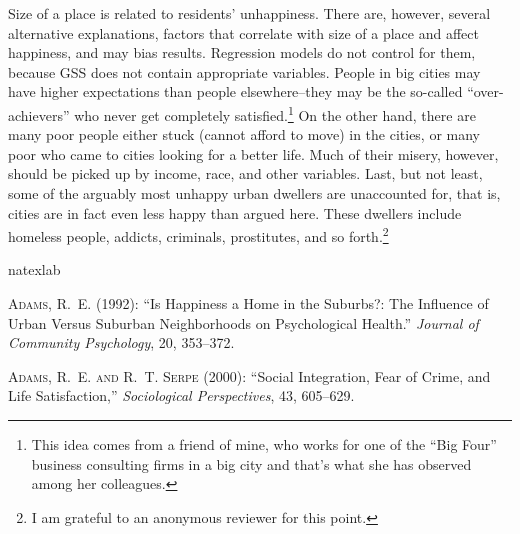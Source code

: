 \documentclass[12pt, letterpaper]{article}
\begin{document}
\begin{spacing}{1.9}
  
Size of a place is related to residents' unhappiness. 
 There are, however, several alternative
explanations, factors that correlate with size of a place and affect
happiness, and may bias results. Regression models do not control for them, because
GSS does not contain appropriate variables. 
People in big cities may have higher expectations than people
elsewhere--they may be the so-called ``over-achievers'' who never get
completely satisfied.\footnote{This idea comes from a friend of mine,
  who works for one of the ``Big Four''  business consulting firms in
  a big city and that's what she has observed among her colleagues.} On
the other hand, there are many poor people either stuck (cannot afford
to move) in the cities, or many poor who came to cities looking for a
better life. Much of their misery, however, should be picked up by
income, race, and other variables. 
Last, but not least, some of the arguably most unhappy urban dwellers are
unaccounted for, that is, cities are in fact even less happy than argued
here. These dwellers include homeless people, addicts, criminals, prostitutes,
and so forth.\footnote{I am grateful to an anonymous reviewer for this point.}

  
  
% 

\newpage
%
%
\begin{thebibliography}{77}
\newcommand{\enquote}[1]{``#1''}
\expandafter\ifx\csname natexlab\endcsname\relax\def\natexlab#1{#1}\fi

\textsc{Adams, R.~E.} (1992): \enquote{Is Happiness a Home in the Suburbs?: The
  Influence of Urban Versus Suburban Neighborhoods on Psychological Health.}
  \emph{Journal of Community Psychology}, 20, 353--372.

\textsc{Adams, R.~E. and R.~T. Serpe} (2000): \enquote{Social Integration, Fear
  of Crime, and Life Satisfaction,} \emph{Sociological Perspectives}, 43,
  605--629.


\end{thebibliography}
\end{spacing}
\end{document}
